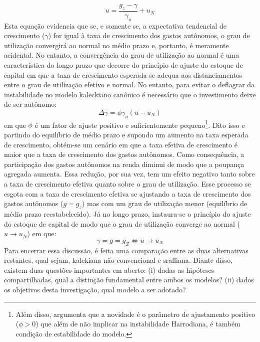 \begin{equation}
u = \frac{g_z - \gamma}{\gamma_u} + u_N
\end{equation}
Esta equação evidencia que se, e somente se, a expectativa tendencial de crescimento ($\gamma$) for igual à taxa de crescimento dos gastos autônomos, o grau de utilização convergirá ao normal no médio prazo e, portanto, é meramente acidental. No entanto, a convergência do grau de utilização ao normal é uma característica do longo prazo que decorre do princípio de ajuste do estoque de capital em que a taxa de crescimento esperada se adequa aos distanciamentos entre o grau de utilização efetivo e normal. No entanto, para evitar o deflagrar da instabilidade no modelo kaleckiano canônico é necessário que o investimento deixe de ser autônomo: 
\begin{equation}
\label{eqAllain}
\Delta \gamma = \phi\gamma_u(u - u_N)
\end{equation}
em que $\phi$ é um fator de ajuste positivo e suficientemente pequeno\footnote{
	Além disso, \textcite[p.~14]{allain_tackling_2015} argumenta que a novidade  é o parâmetro  de ajustamento positivo ($\phi > 0$) que além de não implicar na instabilidade Harrodiana, é também condição de estabilidade do modelo.
}.
Dito isso e partindo do equilíbrio de médio prazo e supondo um aumento na taxa esperada de crescimento, obtém-se um cenário em que a taxa efetiva de crescimento é maior que a taxa de crescimento dos gastos autônomos. Como consequência, a participação dos gastos autônomos na renda diminui de modo que  a poupança agregada aumenta. Essa redução, por sua vez, tem um efeito negativo tanto sobre a taxa de crescimento efetiva quanto sobre o grau de utilização. Esse processo se esgota com a taxa de crescimento efetiva se ajustando a taxa de crescimento dos gastos autônomos ($g = g_z$) mas com um grau de utilização menor  (equilíbrio de médio prazo reestabelecido). Já no longo prazo, instaura-se o princípio do ajuste do estoque de capital de modo que o grau de utilização converge ao normal ($u \to u_N$) em que: 
$$
\gamma = g = g_Z \Leftrightarrow u \to u_N
$$
Para encerrar essa discussão, é feita uma comparação entre as duas alternativas restantes, qual sejam, kalekiana não-convencional e sraffiana.  Diante disso, existem duas questões importantes em aberto: (i) dadas as hipóteses compartilhadas, qual a distinção fundamental entre ambos os modelos? (ii) dados os objetivos desta investigação, qual modelo a ser adotado? 


